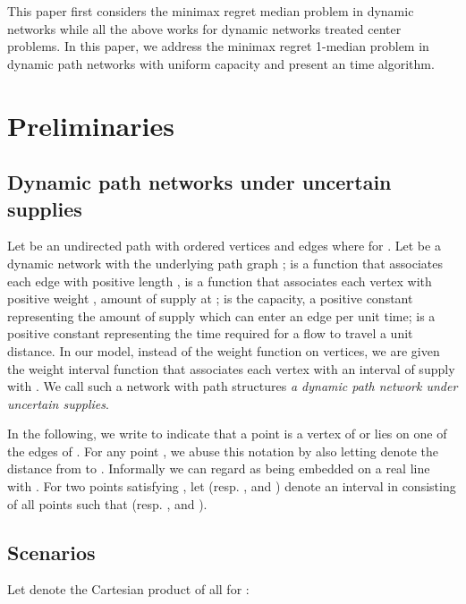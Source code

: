 \documentclass[a4paper]{llncs}
\begin{document}
This paper first considers the minimax regret median problem in dynamic networks while all the above works for dynamic networks treated center problems.
In this paper, we address the minimax regret 1-median problem in dynamic path networks with uniform capacity and present an  time algorithm. \\





















\section{Preliminaries}
\label{sec:pre}

\subsection{Dynamic path networks under uncertain supplies}
\label{subsec:dpn}
Let  be an undirected path with ordered vertices   and  edges  where
  for .
Let  be a dynamic network 
with the underlying path graph ; 
 is a function that associates each edge  with positive length , 
 is a function that associates each vertex  with positive weight , amount of supply at ;
 is the capacity, a positive constant representing the amount of supply which can enter an edge per unit time;
 is a positive constant representing the time required for a flow to travel a unit distance.
In our model, instead of the weight function  on vertices, we are given the weight interval function 
that associates each vertex  with an interval of supply  with .
We call such a network  with path structures {\it a dynamic path network under uncertain supplies}.

In the following, we write  to indicate that a point is a vertex of  or lies on one of the edges of .  
For any point ,
we abuse this notation by also letting  denote the distance from  to . 
Informally we can regard  as being embedded on a real line with .
For two points  satisfying , 
let  (resp. ,  and ) denote an interval in  consisting of all points  
such that  (resp. ,  and ).

\subsection{Scenarios}
\label{subsec:scn}
Let  denote the Cartesian product of all  for :
\end{document}
